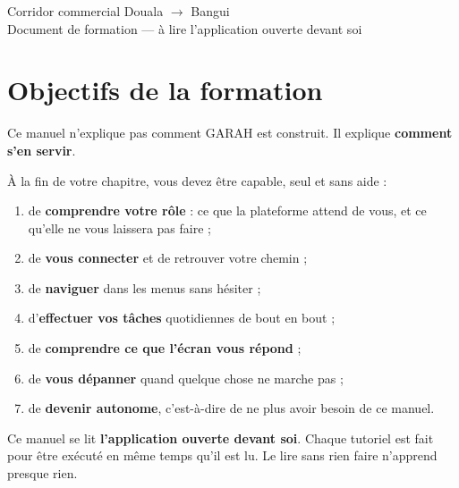 \documentclass[11pt,a4paper]{report}
\begin{document}
\begin{titlepage}
\vfill
{\footnotesize\color{garahAttenue}
 Corridor commercial Douala $\rightarrow$ Bangui\\
 Document de formation --- à lire l'application ouverte devant soi\par}
\end{titlepage}

\tableofcontents
\clearpage

\chapter*{Objectifs de la formation}

Ce manuel n'explique pas comment GARAH est construit. Il explique
\textbf{comment s'en servir}.

À la fin de votre chapitre, vous devez être capable, seul et sans aide :

\begin{enumerate}[leftmargin=*,itemsep=4pt]
  \item de \textbf{comprendre votre rôle} : ce que la plateforme attend de
        vous, et ce qu'elle ne vous laissera pas faire ;
  \item de \textbf{vous connecter} et de retrouver votre chemin ;
  \item de \textbf{naviguer} dans les menus sans hésiter ;
  \item d'\textbf{effectuer vos tâches} quotidiennes de bout en bout ;
  \item de \textbf{comprendre ce que l'écran vous répond} ;
  \item de \textbf{vous dépanner} quand quelque chose ne marche pas ;
  \item de \textbf{devenir autonome}, c'est-à-dire de ne plus avoir besoin de
        ce manuel.
\end{enumerate}

\begin{retenir}
Ce manuel se lit \textbf{l'application ouverte devant soi}. Chaque tutoriel est
fait pour être exécuté en même temps qu'il est lu. Le lire sans rien faire
n'apprend presque rien.
\end{retenir}

\end{document}
